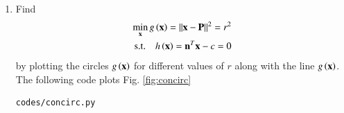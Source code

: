 \renewcommand{\theequation}{\theenumi}
\begin{enumerate}[label=\arabic*.,ref=\thesection.\theenumi]

\item
	\label{convex_code}
Find
\begin{align}
\label{eq:opt_line_nor_h}
	\min_{\mathbf{x}}g\left(\mathbf{x}\right) = \left\lVert\mathbf{x}-\mathbf{P}\right\rVert^2 = r^2 \\
\text{s.t.} \quad 	h\left(\mathbf{x}\right) = \mathbf{n}^T\mathbf{x} - c = 0\label{eq2_1_line}
\end{align}
by plotting the circles $g\left(\mathbf{x}\right)$
%
%
for different values of $r$ along with the line $g\left(\mathbf{x}\right)$.
%
%
\\
\solution 
The following code plots Fig. \ref{fig:concirc}	

%	
\begin{lstlisting}
codes/concirc.py
\end{lstlisting}


\end{enumerate}
